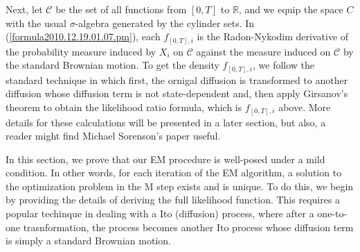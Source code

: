 \documentclass[12pt]{article}%
\begin{document}
Next, let $\mathcal C$ be the set of all functions from $[0,T]$ to $\mathbb R$, and 
we equip the space $C$ with the usual $\sigma$-algebra generated by the cylinder sets. 
In (\ref{formula2010.12.19.01.07.pm}), 
each $f_{[0,T],i}$ is the Radon-Nykodim derivative of the probability measure induced by $X_i$ 
on $\mathcal C$ against the measure induced on $\mathcal C$ by the standard Brownian motion. 
To get the density $f_{[0,T],i}$, we follow the standard technique in which 
first, the ornigal diffusion is transformed to another diffusion whose
diffusion term is not state-dependent and, then apply Girsanov's theorem to obtain
the likelihood ratio formula, which is $f_{[0,T],i}$ above.  More details for these calculations 
will be presented in a later section, but also, a reader might find Michael Sorenson's 
paper useful. 


In this section, we prove that our EM procedure is well-posed under
a mild condition.  In other words, for each iteration of the EM algorithm,
a solution to the optimization problem in the M step exists and is unique.
To do this, we begin by providing the details 
of deriving the full likelihood function. This requires a popular techinque
in dealing with a Ito (diffusion) process, where after a one-to-one trasnformation, the process becomes another Ito process whose diffusion term is simply a standard Brownian motion.
\end{document}
